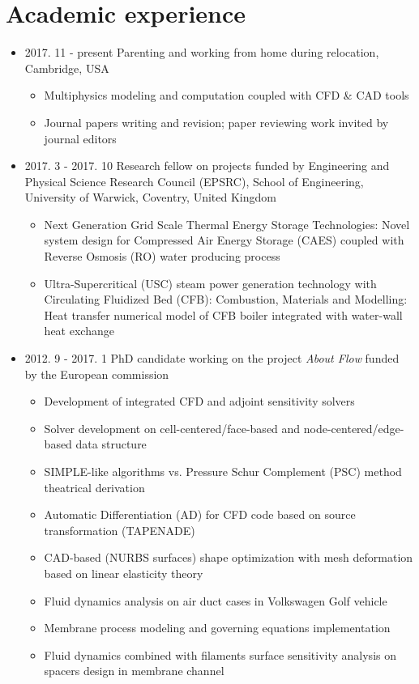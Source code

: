 \documentclass[letterpaper]{article}
\begin{document}
\section*{Academic experience}
\vspace{-10pt}
\begin{itemize}
\item 2017. 11 - present \hspace{2pt} Parenting and working from home during relocation, Cambridge, USA
		\begin{itemize}
		\item Multiphysics modeling and computation coupled with CFD \& CAD tools
		\item	Journal papers writing and revision; paper reviewing work invited by journal editors
		\end{itemize}		
\item 2017. 3 - 2017. 10  \hspace{2pt} Research fellow on projects funded by Engineering and Physical Science Research Council (EPSRC), School of Engineering, University of Warwick, Coventry, United Kingdom
		\begin{itemize}
		\item	Next Generation Grid Scale Thermal Energy Storage Technologies: Novel system design for Compressed Air Energy Storage (CAES) coupled with Reverse Osmosis (RO) water producing process
		\item	Ultra-Supercritical (USC) steam power generation technology with Circulating Fluidized Bed (CFB): Combustion, Materials and Modelling: Heat transfer numerical model of CFB boiler integrated with water-wall heat exchange
		\end{itemize}

\item 2012. 9 - 2017. 1  \hspace{2pt} PhD candidate working on the project \textit{About Flow} funded by the European commission
		\begin{itemize}
		\item Development of integrated CFD and adjoint sensitivity solvers
		\item Solver development on cell-centered/face-based and node-centered/edge-based data structure
		\item	SIMPLE-like algorithms vs. Pressure Schur Complement (PSC) method theatrical derivation
		\item	Automatic Differentiation (AD) for CFD code based on source transformation (TAPENADE)		
		\item	CAD-based (NURBS surfaces) shape optimization with mesh deformation based on linear elasticity theory
		\item	Fluid dynamics analysis on air duct cases in Volkswagen Golf vehicle
		\item	Membrane process modeling and governing equations implementation
		\item	Fluid dynamics combined with filaments surface sensitivity analysis on spacers design in membrane channel
		\end{itemize}
		

\end{itemize}
\end{document}
